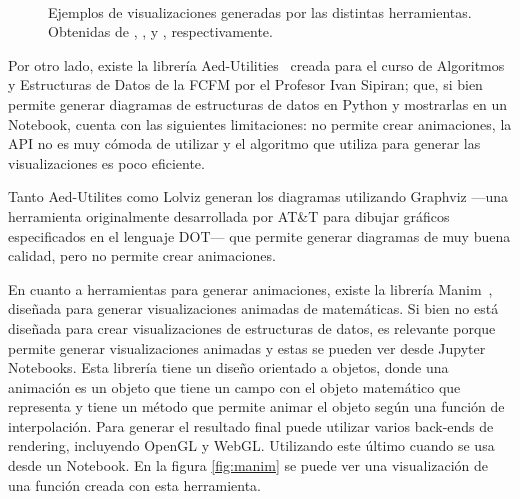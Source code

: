 \begin{figure}[h!]
{        \label{fig:lolviz}
    }\\
    \caption[Ejemplos de las distintas herramientas.]{Ejemplos de visualizaciones generadas por las distintas herramientas. Obtenidas de \cite{Stanch2021}, \cite{Lolviz}, \cite{aed-utilities} y \cite{manim}, respectivamente.}
    \label{fig:comparacion}
\end{figure}

Por otro lado, existe la librería Aed-Utilities~\cite{aed-utilities} creada para el curso de Algoritmos y Estructuras de Datos de la FCFM por el Profesor Ivan Sipiran; que, si bien permite generar diagramas de estructuras de datos en Python y mostrarlas en un Notebook, cuenta con las siguientes limitaciones: no permite crear animaciones, la API no es muy cómoda de utilizar y el algoritmo que utiliza para generar las visualizaciones es poco eficiente. %

Tanto Aed-Utilites como Lolviz generan los diagramas utilizando Graphviz ---una herramienta originalmente desarrollada por AT\&T para dibujar gráficos especificados en el lenguaje DOT--- que permite generar diagramas de muy buena calidad, pero no permite crear animaciones.

En cuanto a herramientas para generar animaciones, existe la librería Manim~\cite{manim}, diseñada para generar visualizaciones animadas de matemáticas. Si bien no está diseñada para crear visualizaciones de estructuras de datos, es relevante porque permite generar visualizaciones animadas y estas se pueden ver desde Jupyter Notebooks. Esta librería tiene un diseño orientado a objetos, donde una animación es un objeto que tiene un campo con el objeto matemático que representa y tiene un método que permite animar el objeto según una función de interpolación. Para generar el resultado final puede utilizar varios back-ends de rendering, incluyendo OpenGL y WebGL. Utilizando este último cuando se usa desde un Notebook. En la figura \ref{fig:manim} se puede ver una visualización de una función creada con esta herramienta.

